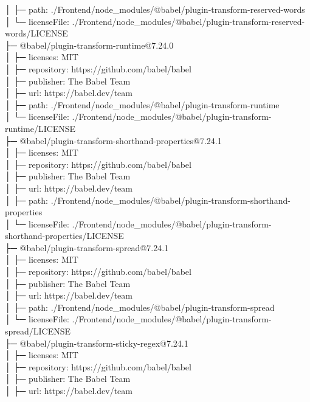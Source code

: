 \documentclass[
    paper=a4,
    twoside=false,
    parskip=half,
    listof=entryprefix,
    listof=totoc,
    index=totoc,
    bibliography=totoc,
    headsepline,
]{scrbook}
\begin{document}
    │  ├─ path: ./Frontend/node\_modules/@babel/plugin-transform-reserved-words\\
    │  └─ licenseFile: ./Frontend/node\_modules/@babel/plugin-transform-reserved-words/LICENSE\\
    ├─ @babel/plugin-transform-runtime@7.24.0\\
    │  ├─ licenses: MIT\\
    │  ├─ repository: https://github.com/babel/babel\\
    │  ├─ publisher: The Babel Team\\
    │  ├─ url: https://babel.dev/team\\
    │  ├─ path: ./Frontend/node\_modules/@babel/plugin-transform-runtime\\
    │  └─ licenseFile: ./Frontend/node\_modules/@babel/plugin-transform-runtime/LICENSE\\
    ├─ @babel/plugin-transform-shorthand-properties@7.24.1\\
    │  ├─ licenses: MIT\\
    │  ├─ repository: https://github.com/babel/babel\\
    │  ├─ publisher: The Babel Team\\
    │  ├─ url: https://babel.dev/team\\
    │  ├─ path: ./Frontend/node\_modules/@babel/plugin-transform-shorthand-properties\\
    │  └─ licenseFile: ./Frontend/node\_modules/@babel/plugin-transform-shorthand-properties/LICENSE\\
    ├─ @babel/plugin-transform-spread@7.24.1\\
    │  ├─ licenses: MIT\\
    │  ├─ repository: https://github.com/babel/babel\\
    │  ├─ publisher: The Babel Team\\
    │  ├─ url: https://babel.dev/team\\
    │  ├─ path: ./Frontend/node\_modules/@babel/plugin-transform-spread\\
    │  └─ licenseFile: ./Frontend/node\_modules/@babel/plugin-transform-spread/LICENSE\\
    ├─ @babel/plugin-transform-sticky-regex@7.24.1\\
    │  ├─ licenses: MIT\\
    │  ├─ repository: https://github.com/babel/babel\\
    │  ├─ publisher: The Babel Team\\
    │  ├─ url: https://babel.dev/team\\
\end{document}
